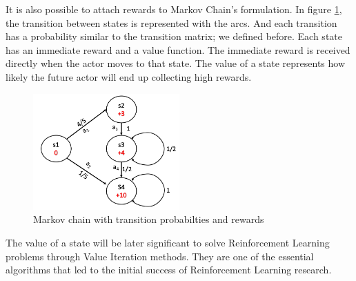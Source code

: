 It is also possible to attach rewards to Markov Chain’s formulation. In figure \ref{fig: markov_chain}, the transition between states is represented with the arcs. And each transition has a probability similar to the transition matrix; we defined before. Each state has an immediate reward and a value function. The immediate reward is received directly when the actor moves to that state. The value of a state represents how likely the future actor will end up collecting high rewards. 

\begin{figure}[htbp]
    \centering
    \includegraphics[width=0.5\textwidth]{figures/markovchain}
    \caption{Markov chain with transition probabilties and rewards}
    \label{fig: markov_chain}
\end{figure}

The value of a state will be later significant to solve Reinforcement Learning problems through Value Iteration methods. They are one of the essential algorithms that led to the initial success of Reinforcement Learning research.
